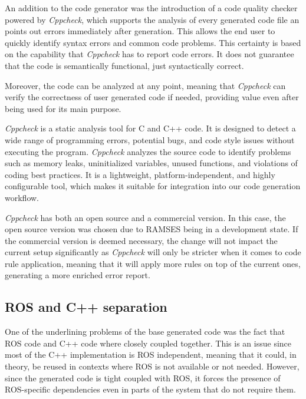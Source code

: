 An addition to the code generator was the introduction of a code quality checker powered by \textit{Cppcheck}, which supports the analysis of every generated code file an points out errors immediately after generation. This allows the end user to quickly identify syntax errors and common code problems. This certainty is based on the capability that \textit{Cppcheck} has to report code errors. It does not guarantee that the code is semantically functional, just syntactically correct.

Moreover, the code can be analyzed at any point, meaning that \textit{Cppcheck} can verify the correctness of user generated code if needed, providing value even after being used for its main purpose.

\textit{Cppcheck} is a static analysis tool for C and C++ code. It is designed to detect a wide range of programming errors, potential bugs, and code style issues without executing the program. \textit{Cppcheck} analyzes the source code to identify problems such as memory leaks, uninitialized variables, unused functions, and violations of coding best practices. It is a lightweight, platform-independent, and highly configurable tool, which makes it suitable for integration into our code generation workflow.

\textit{Cppcheck} has both an open source and a commercial version. In this case, the open source version was chosen due to \gls{RAMSES} being in a development state. If the commercial version is deemed necessary, the change will not impact the current setup significantly as \textit{Cppcheck} will only be stricter when it comes to code rule application, meaning that it will apply more rules on top of the current ones, generating a more enriched error report.

\subsection{ROS and C++ separation}
\label{sec:impl_ros_separation}

One of the underlining problems of the base generated code was the fact that \gls{ROS} code and C++ code where closely coupled together. This is an issue since most of the C++ implementation is \gls{ROS} independent, meaning that it could, in theory, be reused in contexts where \gls{ROS} is not available or not needed. However, since the generated code is tight coupled with \gls{ROS}, it forces the presence of ROS-specific dependencies even in parts of the system that do not require them. 

